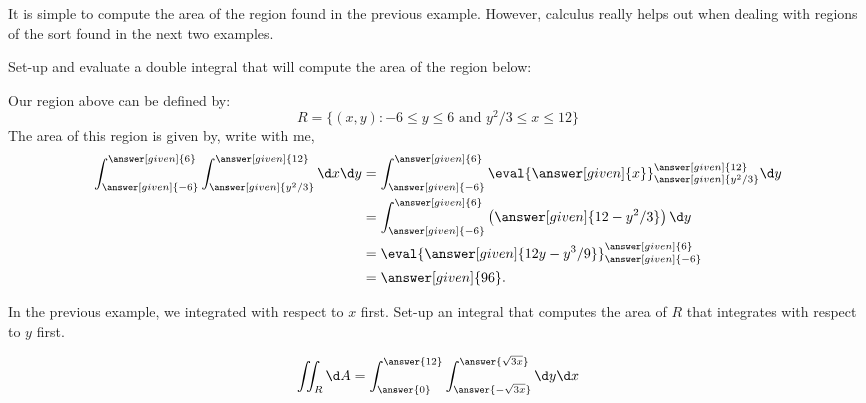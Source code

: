\documentclass{ximera}
\begin{document}
It is simple to compute the area of the region found in the previous
example. However, calculus really helps out when dealing with regions
of the sort found in the next two examples.

\begin{example}
  Set-up and evaluate a double integral that will compute the area of
  the region below:
  \begin{image}
  \end{image}
  \begin{explanation}
    Our region above can be defined by:
    \[
    R=\{(x,y):\text{$-6\leq y\leq 6$ and $y^2/3\leq x\leq 12$}\}
    \]
    The area of this region is given by, write with me, 
    \begin{align*}
      \int_{\answer[given]{-6}}^{\answer[given]{6}}\int_{\answer[given]{y^2/3}}^{\answer[given]{12}}\d x \d y &= \int_{\answer[given]{-6}}^{\answer[given]{6}} \eval{\answer[given]{x}}_{\answer[given]{y^2/3}}^{\answer[given]{12}} \d y\\
      &=  \int_{\answer[given]{-6}}^{\answer[given]{6}} \left(\answer[given]{12-y^2/3}\right) \d y\\
      &=  \eval{\answer[given]{12y-y^3/9}}_{\answer[given]{-6}}^{\answer[given]{6}}\\
      &= \answer[given]{96}. 
    \end{align*}
  \end{explanation}
\end{example}

\begin{question}
  In the previous example, we integrated with respect to $x$
  first. Set-up an integral that computes the area of $R$ that
  integrates with respect to $y$ first.
  \begin{prompt}
    \[
    \iint_R \d A = \int_{\answer{0}}^{\answer{12}}\int_{\answer{-\sqrt{3x}}}^{\answer{\sqrt{3x}}} \d y \d x
    \]
  \end{prompt}
\end{question}
\end{document}
